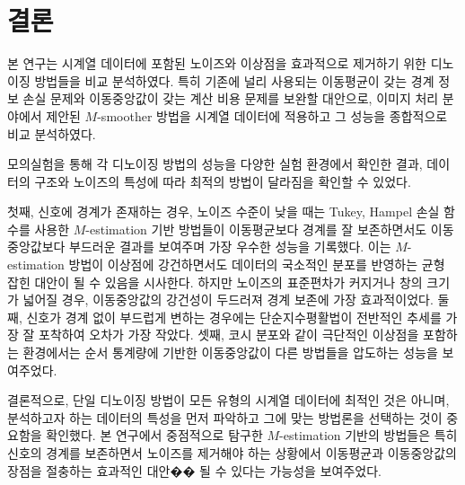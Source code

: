 \documentclass[letterpaper,12pt]{article}
\begin{document}
{\section{결론}\label{sec:discuss}
본 연구는 시계열 데이터에 포함된 노이즈와 이상점을 효과적으로 제거하기 위한 디노이징 방법들을 비교 분석하였다. 특히 기존에 널리 사용되는 이동평균이 갖는 경계 정보 손실 문제와 이동중앙값이 갖는 계산 비용 문제를 보완할 대안으로, 이미지 처리 분야에서 제안된 $M$-smoother 방법을 시계열 데이터에 적용하고 그 성능을 종합적으로 비교 분석하였다.


%
모의실험을 통해 각 디노이징 방법의 성능을 다양한 실험 환경에서 확인한 결과, 데이터의 구조와 노이즈의 특성에 따라 최적의 방법이 달라짐을 확인할 수 있었다.
%

%
첫째, 신호에 경계가 존재하는 경우, 노이즈 수준이 낮을 때는 Tukey, Hampel 손실 함수를 사용한 $M$-estimation 기반 방법들이 이동평균보다 경계를 잘 보존하면서도 이동중앙값보다 부드러운 결과를 보여주며 가장 우수한 성능을 기록했다. 이는 $M$-estimation 방법이 이상점에 강건하면서도 데이터의 국소적인 분포를 반영하는 균형 잡힌 대안이 될 수 있음을 시사한다. 하지만 노이즈의 표준편차가 커지거나 창의 크기가 넓어질 경우, 이동중앙값의 강건성이 두드러져 경계 보존에 가장 효과적이었다. 둘째, 신호가 경계 없이 부드럽게 변하는 경우에는 단순지수평활법이 전반적인 추세를 가장 잘 포착하여 오차가 가장 작았다. 셋째, 코시 분포와 같이 극단적인 이상점을 포함하는 환경에서는 순서 통계량에 기반한 이동중앙값이 다른 방법들을 압도하는 성능을 보여주었다.
%

결론적으로, 단일 디노이징 방법이 모든 유형의 시계열 데이터에 최적인 것은 아니며, 분석하고자 하는 데이터의 특성을 먼저 파악하고 그에 맞는 방법론을 선택하는 것이 중요함을 확인했다. 본 연구에서 중점적으로 탐구한 $M$-estimation 기반의 방법들은 특히 신호의 경계를 보존하면서 노이즈를 제거해야 하는 상황에서 이동평균과 이동중앙값의 장점을 절충하는 효과적인 대안�� 될 수 있다는 가능성을 보여주었다.






\clearpage







\newpage
\thispagestyle{empty}
\begin{center}
\vspace{3.5cm}
\fontsize{14}{10} \selectfont{Comparative study on denoising methods for time series\\}
\vspace{1.5cm}
\fontsize{12}{10} \selectfont{Donghyeok Kim\\}
\vspace{1cm}
\fontsize{11}{10} \selectfont{Department of Statistics\\
The Graduate School\\
Pusan National University\\}
\vspace{1.5cm}
\fontsize{12}{10} \selectfont{Abstract\\}
\vspace{-\baselineskip}
\end{center}

}
\end{document}
